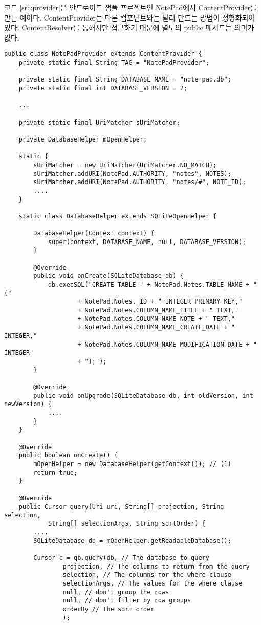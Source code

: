
코드 \ref{src:provider}은 안드로이드 샘플 프로젝트인 NotePad에서 ContentProvider를 만든 예이다. ContentProvider는 다른 컴포넌트와는 달리 만드는 방법이 정형화되어 있다. ContentResolver를 통해서만 접근하기 때문에 별도의 public 메서드는 의미가 없다.

\begin{lstlisting}[frame=single, caption=ContentProvider 예, label=src:provider] 
public class NotePadProvider extends ContentProvider {
	private static final String TAG = "NotePadProvider";

	private static final String DATABASE_NAME = "note_pad.db";
	private static final int DATABASE_VERSION = 2;

	...

	private static final UriMatcher sUriMatcher;

	private DatabaseHelper mOpenHelper;

	static {
		sUriMatcher = new UriMatcher(UriMatcher.NO_MATCH);
		sUriMatcher.addURI(NotePad.AUTHORITY, "notes", NOTES);
		sUriMatcher.addURI(NotePad.AUTHORITY, "notes/#", NOTE_ID);
		....
	}

	static class DatabaseHelper extends SQLiteOpenHelper {

		DatabaseHelper(Context context) {
			super(context, DATABASE_NAME, null, DATABASE_VERSION);
		}

		@Override
		public void onCreate(SQLiteDatabase db) {
			db.execSQL("CREATE TABLE " + NotePad.Notes.TABLE_NAME + " ("
					+ NotePad.Notes._ID + " INTEGER PRIMARY KEY,"
					+ NotePad.Notes.COLUMN_NAME_TITLE + " TEXT,"
					+ NotePad.Notes.COLUMN_NAME_NOTE + " TEXT,"
					+ NotePad.Notes.COLUMN_NAME_CREATE_DATE + " INTEGER,"
					+ NotePad.Notes.COLUMN_NAME_MODIFICATION_DATE + " INTEGER"
					+ ");");
		}

		@Override
		public void onUpgrade(SQLiteDatabase db, int oldVersion, int newVersion) {
			....
		}
	}

	@Override
	public boolean onCreate() {
		mOpenHelper = new DatabaseHelper(getContext()); // (1)
		return true;
	}

	@Override
	public Cursor query(Uri uri, String[] projection, String selection,
			String[] selectionArgs, String sortOrder) {
		....
		SQLiteDatabase db = mOpenHelper.getReadableDatabase();

		Cursor c = qb.query(db, // The database to query
				projection, // The columns to return from the query
				selection, // The columns for the where clause
				selectionArgs, // The values for the where clause
				null, // don't group the rows
				null, // don't filter by row groups
				orderBy // The sort order
				);


\end{lstlisting}
